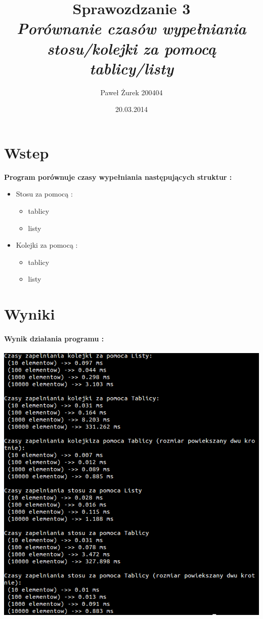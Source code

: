 \documentclass[10 pt]{article}
\title{Sprawozdzanie 3\\ \emph{\textbf{Porównanie czasów wypełniania stosu/kolejki za pomocą
tablicy/listy }}}
\author{Paweł Żurek 200404}
\date{20.03.2014}
\begin{document}
\tableofcontents
\maketitle
\section{Wstep}
\textbf{Program porównuje czasy wypełniania następujących struktur : }
\begin{itemize}
\item Stosu za pomocą :
\begin{itemize}
\item tablicy
\item listy
\end{itemize}
\item Kolejki za pomocą :
\begin{itemize}
\item tablicy
\item listy
\end{itemize}
\end{itemize}

\section{Wyniki}

\paragraph{Wynik działania programu  : \\}
\begin{center}
\includegraphics[scale=0.5]{dzialanie.png}
\end{center}
\newpage
\end{document}
